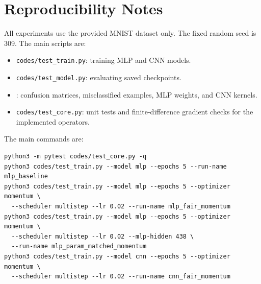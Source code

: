 \documentclass[11pt]{ctexart}
\begin{document}
\section*{Reproducibility Notes}
All experiments use the provided MNIST dataset only. The fixed random seed is 309. The main scripts are:
\begin{itemize}
  \item \texttt{codes/test\_train.py}: training MLP and CNN models.
  \item \texttt{codes/test\_model.py}: evaluating saved checkpoints.
  \item {}: confusion matrices, misclassified examples, MLP weights, and CNN kernels.
  \item \texttt{codes/test\_core.py}: unit tests and finite-difference gradient checks for the implemented operators.
\end{itemize}

The main commands are:
\begin{verbatim}
python3 -m pytest codes/test_core.py -q
python3 codes/test_train.py --model mlp --epochs 5 --run-name mlp_baseline
python3 codes/test_train.py --model mlp --epochs 5 --optimizer momentum \
  --scheduler multistep --lr 0.02 --run-name mlp_fair_momentum
python3 codes/test_train.py --model mlp --epochs 5 --optimizer momentum \
  --scheduler multistep --lr 0.02 --mlp-hidden 438 \
  --run-name mlp_param_matched_momentum
python3 codes/test_train.py --model cnn --epochs 5 --optimizer momentum \
  --scheduler multistep --lr 0.02 --run-name cnn_fair_momentum
\end{verbatim}
\end{document}
